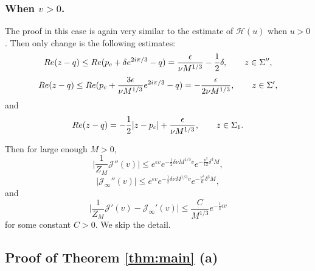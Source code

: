 \documentclass[11pt]{article}
\begin{document}
\subsubsection{When $v>0$.}

The proof in this case is again very similar to the
estimate of $\mathcal{H}(u)$ when $u>0$. Then only
change is the following estimates:
\begin{equation}
  Re(z-q) \le Re(p_c+\delta e^{2i\pi/3}-q)
= \frac{\epsilon}{\nu M^{1/3}} - \frac12 \delta,
\qquad z\in \Sigma'',
\end{equation}
\begin{equation}
  Re(z-q)\le Re(p_c+ \frac{3\epsilon}{\nu M^{1/3}} e^{2i\pi/3}-q)
  = -\frac{\epsilon}{2\nu M^{1/3}},
\qquad z\in \Sigma',
\end{equation}
and
\begin{equation}
  Re(z-q) = -\frac12 |z-p_c| + \frac{\epsilon}{\nu M^{1/3}},
\qquad z\in \Sigma_1.
\end{equation}

Then for large enough $M>0$,
\begin{equation}
   \biggl| \frac1{Z_M} \mathcal{J}''(v) \biggr|
\le e^{\epsilon v} e^{-\frac12 \delta \nu M^{1/3} v}
e^{-\frac{\nu^3}{12} \delta^3 M},
\end{equation}
\begin{equation}
   \bigl| \mathcal{J}_\infty''(v) \bigr|
\le e^{\epsilon v} e^{-\frac12 \delta \nu M^{1/3} v}
e^{-\frac{\nu^3}{6} \delta^3 M},
\end{equation}
and
\begin{equation}
   \biggl| \frac1{Z_M} \mathcal{J}'(v)- \mathcal{J}_\infty'(v) \biggr|
\le \frac{C}{M^{1/3}} e^{-\frac12 \epsilon v}
\end{equation}
for some constant $C>0$.
We skip the detail.

\subsection{Proof of Theorem \ref{thm:main} (a)}
\end{document}
